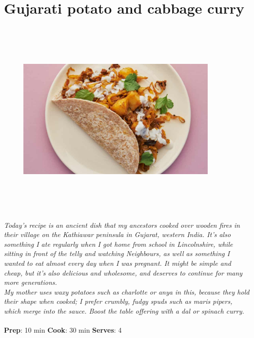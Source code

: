 \documentclass{book}
\begin{document}
\section{Gujarati potato and cabbage curry}
\begin{figure}
\centering\includegraphics[width=10cm,height=10cm,keepaspectratio]{Recipe_Pictures/Gujarati_potato_and_cabbage_curry.png}
\end{figure}
\emph{Today’s recipe is an ancient dish that my ancestors cooked over wooden fires in their village on the Kathiawar peninsula in Gujarat, western India. It’s also something I ate regularly when I got home from school in Lincolnshire, while sitting in front of the telly and watching Neighbours, as well as something I wanted to eat almost every day when I was pregnant. It might be simple and cheap, but it’s also delicious and wholesome, and deserves to continue for many more generations.\\ 
My mother uses waxy potatoes such as charlotte or anya in this, because they hold their shape when cooked; I prefer crumbly, fudgy spuds such as maris pipers, which merge into the sauce. Boost the table offering with a dal or spinach curry.}\\\\ 
\textbf{Prep}: 10 min
\textbf{Cook}: 30 min
\textbf{Serves}: 4
\end{document}
